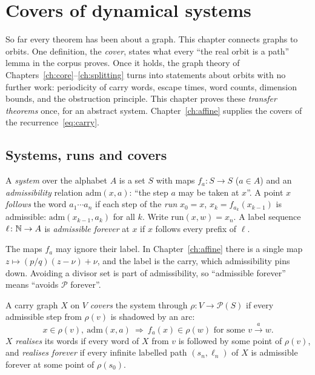 \chapter{Covers of dynamical systems}\label{ch:covers}

So far every theorem has been about a graph. This chapter connects graphs to orbits. One
definition, the \emph{cover}, states what every ``the real orbit is a path'' lemma in the
corpus proves. Once it holds, the graph theory of Chapters~\ref{ch:core}--\ref{ch:splitting}
turns into statements about orbits with no further work: periodicity of carry words, escape
times, word counts, dimension bounds, and the obstruction principle. This chapter proves these
\emph{transfer theorems} once, for an abstract system. Chapter~\ref{ch:affine} supplies the
covers of the recurrence~\eqref{eq:carry}.

\section{Systems, runs and covers}

\begin{definition}\label{def:system}
A \emph{system} over the alphabet \(A\) is a set \(S\) with maps \(f_a\colon S\to S\)
(\(a\in A\)) and an \emph{admissibility} relation \(\mathrm{adm}(x,a)\): ``the step \(a\) may be
taken at \(x\)''. A point \(x\) \emph{follows} the word \(a_1\cdots a_n\) if each step of the
\emph{run} \(x_0=x\), \(x_k=f_{a_k}(x_{k-1})\) is admissible: \(\mathrm{adm}(x_{k-1},a_k)\) for
all \(k\). Write \(\mathrm{run}(x,w)=x_n\). A label sequence \(\ell\colon\mathbb{N}\to A\) is
\emph{admissible forever} at \(x\) if \(x\) follows every prefix of \(\ell\).
\end{definition}

The maps \(f_a\) may ignore their label. In Chapter~\ref{ch:affine} there is a single map
\(z\mapsto(p/q)(z-\nu)+\nu\), and the label is the carry, which admissibility pins down. Avoiding
a divisor set is part of admissibility, so ``admissible forever'' means ``avoids \(\mathcal P\)
forever''.

\begin{definition}\label{def:cover}
A carry graph \(X\) on \(V\) \emph{covers} the system through \(\rho\colon V\to\mathcal P(S)\)
if every admissible step from \(\rho(v)\) is shadowed by an arc:
\[
x\in\rho(v),\ \mathrm{adm}(x,a)\ \Longrightarrow\ f_a(x)\in\rho(w)\text{ for some }
v\xrightarrow{a}w.
\]
\(X\) \emph{realises} its words if every word of \(X\) from \(v\) is followed by some point of
\(\rho(v)\), and \emph{realises forever} if every infinite labelled path
\((s_n,\ell_n)\) of \(X\) is admissible forever at some point of \(\rho(s_0)\).
\end{definition}

